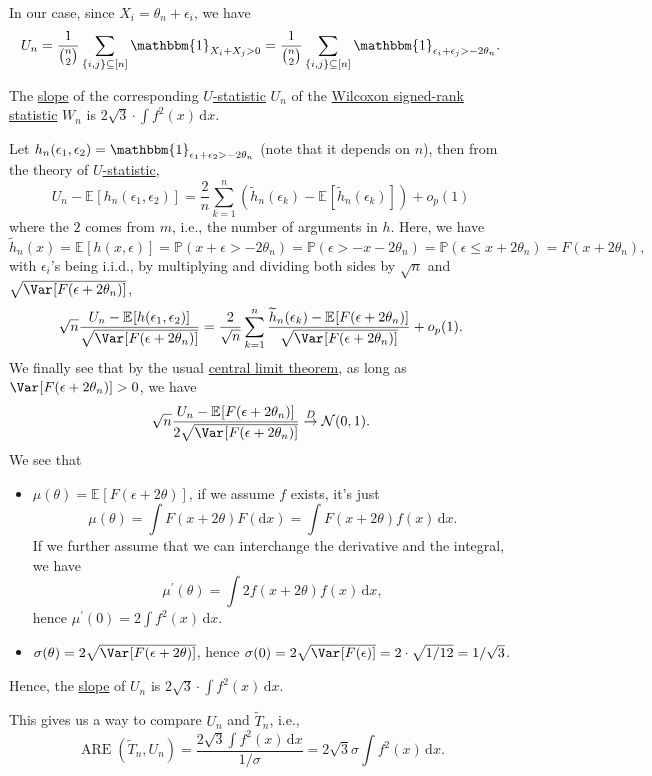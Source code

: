 In our case, since \(X_i = \theta _n + \epsilon _i\), we have
\[
	U_n
	= \frac{1}{\binom{n}{2}} \sum_{\{ i, j \} \subseteq [n]} \mathbbm{1}_{X_i + X_j > 0}
	= \frac{1}{\binom{n}{2}} \sum_{\{ i, j \} \subseteq [n]} \mathbbm{1}_{\epsilon _i + \epsilon _j > - 2 \theta _n}.
\]

\begin{eg}
	The \hyperref[def:slope]{slope} of the corresponding \hyperref[def:U-statistic]{\(U\)-statistic} \(U_n\) of the \hyperref[def:Wilcoxon-signed-rank-statistic]{Wilcoxon signed-rank statistic} \(W_n\) is \(2 \sqrt{3} \cdot \int f^2(x) \,\mathrm{d} x\).
\end{eg}
\begin{explanation}
	Let \(h_n(\epsilon _1, \epsilon _2) = \mathbbm{1}_{\epsilon _1 + \epsilon _2 > - 2 \theta _n} \) (note that it depends on \(n\)), then from the theory of \hyperref[def:U-statistic]{\(U\)-statistic},
	\[
		U_n - \mathbb{E}_{}[h_n(\epsilon _1, \epsilon _2)]
		= \frac{2}{n} \sum_{k=1}^{n} \left( \widetilde{h} _n(\epsilon _k) - \mathbb{E}_{}[\widetilde{h} _n(\epsilon _k)] \right) + o_p(1)
	\]
	where the \(2\) comes from \(m\), i.e., the number of arguments in \(h\). Here, we have
	\[
		\widetilde{h} _n(x)
		= \mathbb{E}_{}[h(x, \epsilon )]
		= \mathbb{P} (x + \epsilon > - 2\theta _n)
		= \mathbb{P} (\epsilon > -x - 2\theta _n)
		= \mathbb{P} (\epsilon \leq x + 2 \theta _n)
		= F(x + 2 \theta _n),
	\]
	with \(\epsilon _i\)'s being i.i.d., by multiplying and dividing both sides by \(\sqrt{n} \) and \(\sqrt{\Var_{}[F(\epsilon + 2 \theta _n)] } \),
	\[
		\sqrt{n} \frac{U_n - \mathbb{E}_{}[h(\epsilon _1 , \epsilon _2)]}{\sqrt{\Var_{}[F(\epsilon + 2 \theta _n)] } }
		= \frac{2}{\sqrt{n} } \sum_{k=1}^{n} \frac{\widetilde{h} _n(\epsilon _k) - \mathbb{E}_{}[F(\epsilon + 2 \theta _n)] }{\sqrt{\Var_{}[F(\epsilon + 2 \theta _n)] } } + o_p(1).
	\]
	We finally see that by the usual \hyperref[thm:CLT]{central limit theorem}, as long as \(\Var_{}[F(\epsilon + 2 \theta _n)] > 0\), we have
	\[
		\sqrt{n} \frac{U_n - \mathbb{E}_{}[F(\epsilon + 2 \theta _n)] }{2 \sqrt{\Var_{}[F(\epsilon + 2 \theta _n)] } }
		\overset{D}{\to} \mathcal{N} (0, 1).
	\]
	We see that
	\begin{itemize}
		\item \(\mu (\theta ) = \mathbb{E}_{}[F(\epsilon + 2 \theta )] \), if we assume \(f\) exists, it's just
		      \[
			      \mu (\theta ) = \int F(x + 2 \theta ) F(\mathrm{d} x)
			      = \int F(x + 2 \theta ) f(x) \,\mathrm{d} x.
		      \]
		      If we further assume that we can interchange the derivative and the integral, we have
		      \[
			      \mu ^{\prime} (\theta )
			      = \int 2 f(x + 2\theta ) f(x) \,\mathrm{d} x,
		      \]
		      hence \(\mu ^{\prime} (0) = 2 \int f^2(x) \,\mathrm{d} x\).
		\item \(\sigma (\theta ) = 2 \sqrt{\Var_{}[F(\epsilon + 2 \theta )] } \), hence \(\sigma (0) = 2 \sqrt{\Var_{}[F(\epsilon )]} = 2 \cdot \sqrt{1 / 12} = 1 / \sqrt{3}  \).
	\end{itemize}
	Hence, the \hyperref[def:slope]{slope} of \(U_n\) is \(2 \sqrt{3} \cdot \int f^2(x) \,\mathrm{d} x\).
\end{explanation}

This gives us a way to compare \(U_n\) and \(\widetilde{T} _n\), i.e.,
\[
	\operatorname{ARE}(\widetilde{T} _n, U_n)
	= \frac{2 \sqrt{3} \int f^2(x)\,\mathrm{d} x}{1 / \sigma }
	= 2\sqrt{3} \sigma \int f^2(x) \,\mathrm{d} x.
\]